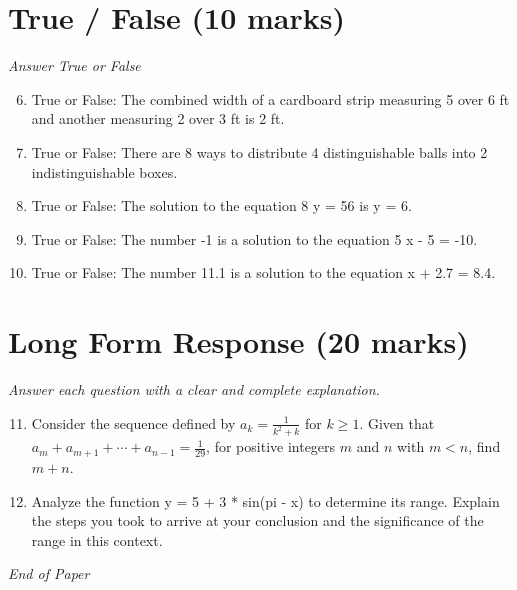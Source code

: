 \documentclass[12pt]{article}
\begin{document}
\section*{True / False (10 marks)}
\textit{Answer True or False}
\begin{enumerate}[label=\arabic*.]
\setcounter{enumi}{5}
\item True or False: The combined width of a cardboard strip measuring 5 over 6 ft and another measuring 2 over 3 ft is 2 ft.
\item True or False: There are 8 ways to distribute 4 distinguishable balls into 2 indistinguishable boxes.
\item True or False: The solution to the equation 8 y = 56 is y = 6.
\item True or False: The number -1 is a solution to the equation 5 x - 5 = -10.
\item True or False: The number 11.1 is a solution to the equation x + 2.7 = 8.4.
\end{enumerate}

\section*{Long Form Response (20 marks)}
\textit{Answer each question with a clear and complete explanation.}
\begin{enumerate}[label=\arabic*.]
\setcounter{enumi}{10}
\item Consider the sequence defined by $a_k=\frac 1{k^2+k}$ for $k\ge 1$. Given that $a_m+a_{m+1}+\cdots+a_{n-1}=\frac{1}{29}$, for positive integers $m$ and $n$ with $m<n$, find $m+n$.
\item Analyze the function y = 5 + 3 * sin(pi - x) to determine its range. Explain the steps you took to arrive at your conclusion and the significance of the range in this context.
\end{enumerate}

\vfill
\noindent\textit{End of Paper}
\end{document}
